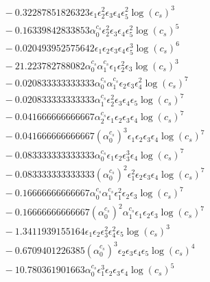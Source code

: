 \documentclass[10pt]{article}
\begin{document}
\begin{align*}
&{}  - 0.32287851826323 \epsilon_{1} \epsilon_{2}^{2} \epsilon_{3} \epsilon_{4} \epsilon_{5}^{2} \log{\left(c_{s} \right)}^{3} \\
&{}  - 0.16339842833853 \alpha_{0}^{c_s} \epsilon_{2}^{2} \epsilon_{3} \epsilon_{4} \epsilon_{5}^{2} \log{\left(c_{s} \right)}^{5} \\
&{}  - 0.020493952575642 \epsilon_{1} \epsilon_{2} \epsilon_{3} \epsilon_{4} \epsilon_{5}^{3} \log{\left(c_{s} \right)}^{6} \\
&{}  - 21.223782788082 \alpha_{0}^{c_s} \alpha_{1}^{c_s} \epsilon_{1} \epsilon_{2}^{2} \epsilon_{3} \log{\left(c_{s} \right)}^{3} \\
&{}  - 0.020833333333333 \alpha_{0}^{c_s} \alpha_{1}^{c_s} \epsilon_{2} \epsilon_{3} \epsilon_{4}^{2} \log{\left(c_{s} \right)}^{7} \\
&{}  - 0.020833333333333 \alpha_{1}^{c_s} \epsilon_{2}^{2} \epsilon_{3} \epsilon_{4} \epsilon_{5} \log{\left(c_{s} \right)}^{7} \\
&{}  - 0.041666666666667 \alpha_{2}^{c_s} \epsilon_{1} \epsilon_{2} \epsilon_{3} \epsilon_{4} \log{\left(c_{s} \right)}^{7} \\
&{}  - 0.041666666666667 \left(\alpha_{0}^{c_s}\right)^{3} \epsilon_{1} \epsilon_{2} \epsilon_{3} \epsilon_{4} \log{\left(c_{s} \right)}^{7} \\
&{}  - 0.083333333333333 \alpha_{0}^{c_s} \epsilon_{1} \epsilon_{2} \epsilon_{3}^{3} \epsilon_{4} \log{\left(c_{s} \right)}^{7} \\
&{}  - 0.083333333333333 \left(\alpha_{0}^{c_s}\right)^{2} \epsilon_{1}^{2} \epsilon_{2} \epsilon_{3} \epsilon_{4} \log{\left(c_{s} \right)}^{7} \\
&{}  - 0.16666666666667 \alpha_{0}^{c_s} \alpha_{1}^{c_s} \epsilon_{1}^{2} \epsilon_{2} \epsilon_{3} \log{\left(c_{s} \right)}^{7} \\
&{}  - 0.16666666666667 \left(\alpha_{0}^{c_s}\right)^{2} \alpha_{1}^{c_s} \epsilon_{1} \epsilon_{2} \epsilon_{3} \log{\left(c_{s} \right)}^{7} \\
&{}  - 1.3411939155164 \epsilon_{1} \epsilon_{2} \epsilon_{3}^{2} \epsilon_{4}^{2} \epsilon_{5} \log{\left(c_{s} \right)}^{3} \\
&{}  - 0.6709401226385 \left(\alpha_{0}^{c_s}\right)^{3} \epsilon_{2} \epsilon_{3} \epsilon_{4} \epsilon_{5} \log{\left(c_{s} \right)}^{4} \\
&{}  - 10.780361901663 \alpha_{0}^{c_s} \epsilon_{1}^{3} \epsilon_{2} \epsilon_{3} \epsilon_{4} \log{\left(c_{s} \right)}^{5} \\

\end{align*}
\end{document}
